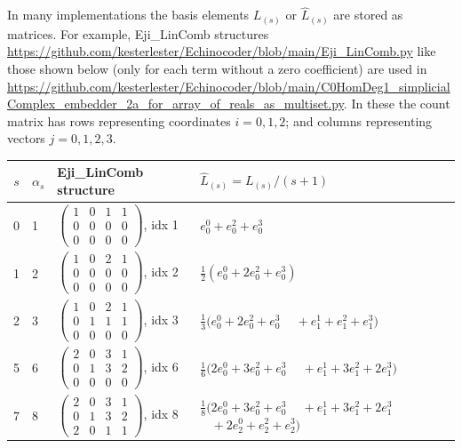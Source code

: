 \documentclass[11pt,a4paper]{article}
\newcommand{\eji}[2]{e^{#1}_{#2}}       %
\begin{document}
In many implementations the basis elements $L_{(s)}$ or ${\hat L}_{(s)}$ are stored as matrices.   For example, Eji\_LinComb
structures \url{https://github.com/kesterlester/Echinocoder/blob/main/Eji_LinComb.py} like those shown
below (only for each term without a zero coefficient) are used in
\url{https://github.com/kesterlester/Echinocoder/blob/main/C0HomDeg1_simplicialComplex_embedder_2a_for_array_of_reals_as_multiset.py}.
In these the count matrix has rows representing
coordinates $i{=}0,1,2$; and columns representing vectors $j{=}0,1,2,3$.
\begin{center}
\small
\setlength{\tabcolsep}{4pt}
\renewcommand{\arraystretch}{1.2}
\begin{tabular}{cl l p{6.6cm}}
\toprule
$s$ & $\alpha_s$ & Eji\_LinComb structure
    &  ${\hat L}_{(s)}=L_{(s)}/(s{+}1)$ \\
\midrule
0 & 1
  & $\begin{pmatrix}1&0&1&1\\0&0&0&0\\0&0&0&0\end{pmatrix}$, idx 1
  & $\eji{0}{0}+\eji{2}{0}+\eji{3}{0}$ \\[8pt]
1 & 2
  & $\begin{pmatrix}1&0&2&1\\0&0&0&0\\0&0&0&0\end{pmatrix}$, idx 2
  & $\tfrac{1}{2}(\eji{0}{0}+2\eji{2}{0}+\eji{3}{0})$ \\[8pt]
2 & 3
  & $\begin{pmatrix}1&0&2&1\\0&1&1&1\\0&0&0&0\end{pmatrix}$, idx 3
  & $\tfrac{1}{3}(\eji{0}{0}+2\eji{2}{0}+\eji{3}{0}$\newline
    $\phantom{\tfrac{1}{3}(}+\eji{1}{1}+\eji{2}{1}+\eji{3}{1})$ \\[8pt]
5 & 6
  & $\begin{pmatrix}2&0&3&1\\0&1&3&2\\0&0&0&0\end{pmatrix}$, idx 6
  & $\tfrac{1}{6}(2\eji{0}{0}+3\eji{2}{0}+\eji{3}{0}$\newline
    $\phantom{\tfrac{1}{6}(}+\eji{1}{1}+3\eji{2}{1}+2\eji{3}{1})$ \\[8pt]
7 & 8
  & $\begin{pmatrix}2&0&3&1\\0&1&3&2\\2&0&1&1\end{pmatrix}$, idx 8
  & $\tfrac{1}{8}(2\eji{0}{0}+3\eji{2}{0}+\eji{3}{0}$\newline
    $\phantom{\tfrac{1}{8}(}+\eji{1}{1}+3\eji{2}{1}+2\eji{3}{1}$\newline
    $\phantom{\tfrac{1}{8}(}+2\eji{0}{2}+\eji{2}{2}+\eji{3}{2})$ \\
\bottomrule
\end{tabular}
\end{center}
\end{document}
